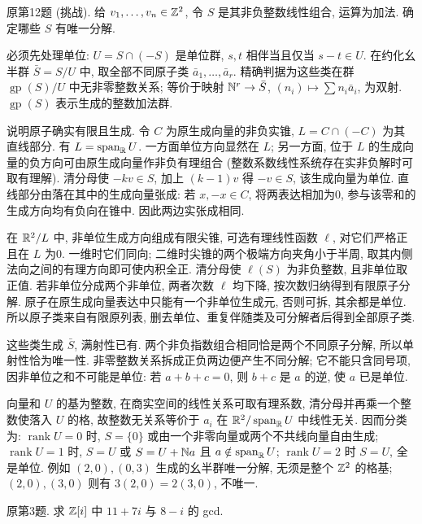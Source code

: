 \begin{exercise}原第12题 (挑战). 给 $v_1,\ldots,v_n\in\mathbb Z^2$, 令 $S$ 是其非负整数线性组合, 运算为加法. 确定哪些 $S$ 有唯一分解.\end{exercise}
\begin{solution}
必须先处理单位: $U=S\cap(-S)$ 是单位群, $s,t$ 相伴当且仅当 $s-t\in U$. 在约化幺半群 $\bar S=S/U$ 中, 取全部不同原子类 $\bar a_1,\ldots,\bar a_r$. 精确判据为这些类在群 $\operatorname{gp}(S)/U$ 中无非零整数关系; 等价于映射 $\mathbb N^r\to\bar S$, $(n_i)\mapsto\sum n_i\bar a_i$, 为双射. $\operatorname{gp}(S)$ 表示生成的整数加法群.

说明原子确实有限且生成. 令 $C$ 为原生成向量的非负实锥, $L=C\cap(-C)$ 为其直线部分. 有 $L=\operatorname{span}_{\mathbb R}U$. 一方面单位方向显然在 $L$; 另一方面, 位于 $L$ 的生成向量的负方向可由原生成向量作非负有理组合 (整数系数线性系统存在实非负解时可取有理解). 清分母使 $-kv\in S$, 加上 $(k-1)v$ 得 $-v\in S$, 该生成向量为单位. 直线部分由落在其中的生成向量张成: 若 $x,-x\in C$, 将两表达相加为0, 参与该零和的生成方向均有负向在锥中. 因此两边实张成相同.

在 $\mathbb R^2/L$ 中, 非单位生成方向组成有限尖锥, 可选有理线性函数 $\ell$, 对它们严格正且在 $L$ 为0. 一维时它们同向; 二维时尖锥的两个极端方向夹角小于半周, 取其内侧法向之间的有理方向即可使内积全正. 清分母使 $\ell(S)$ 为非负整数, 且非单位取正值. 若非单位分成两个非单位, 两者次数 $\ell$ 均下降, 按次数归纳得到有限原子分解. 原子在原生成向量表达中只能有一个非单位生成元, 否则可拆, 其余都是单位. 所以原子类来自有限原列表, 删去单位、重复伴随类及可分解者后得到全部原子类.

这些类生成 $\bar S$, 满射性已有. 两个非负指数组合相同恰是两个不同原子分解, 所以单射性恰为唯一性. 非零整数关系拆成正负两边便产生不同分解; 它不能只含同号项, 因非单位之和不可能是单位: 若 $a+b+c=0$, 则 $b+c$ 是 $a$ 的逆, 使 $a$ 已是单位.

向量和 $U$ 的基为整数, 在商实空间的线性关系可取有理系数, 清分母并再乘一个整数使落入 $U$ 的格, 故整数无关系等价于 $a_i$ 在 $\mathbb R^2/\operatorname{span}_{\mathbb R}U$ 中线性无关. 因而分类为: $\operatorname{rank}U=0$ 时, $S=\{0\}$ 或由一个非零向量或两个不共线向量自由生成; $\operatorname{rank}U=1$ 时, $S=U$ 或 $S=U+\mathbb N a$ 且 $a\notin\operatorname{span}_{\mathbb R}U$; $\operatorname{rank}U=2$ 时 $S=U$, 全是单位. 例如 $(2,0),(0,3)$ 生成的幺半群唯一分解, 无须是整个 $\mathbb Z^2$ 的格基; $(2,0),(3,0)$ 则有 $3(2,0)=2(3,0)$, 不唯一.
\end{solution}
\begin{exercise}原第3题. 求 $\mathbb Z[i]$ 中 $11+7i$ 与 $8-i$ 的 gcd.\end{exercise}

